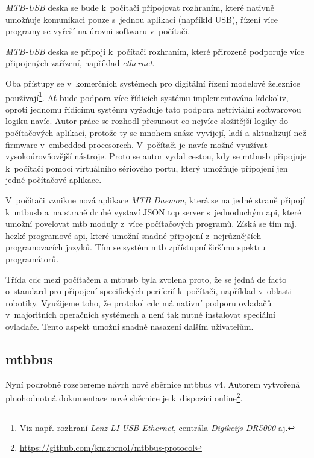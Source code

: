 \begin{compactenum}
\item \textit{MTB-USB} deska se bude k~počítači připojovat rozhraním, které
	nativně umožňuje komunikaci pouze s~jednou aplikací (napříkld USB), řízení
	více programy se vyřeší na úrovni softwaru v~počítači.
\item \textit{MTB-USB} deska se připojí k~počítači rozhraním, které přirozeně
	podporuje více připojených zařízení, například \textit{ethernet}.
\end{compactenum}

Oba přístupy se v~komerčních systémech pro digitální řízení modelové železnice
používají\footnote{Viz např. rozhraní \textit{Lenz LI-USB-Ethernet}, centrála
\textit{Digikeijs DR5000} aj.}.
Ať bude podpora více řídicích systému implementována kdekoliv, oproti jednomu
řídicímu systému vyžaduje tato podpora netriviální softwarovou logiku navíc.
Autor práce se rozhodl přesunout co nejvíce složitější logiky do počítačových
aplikací, protože ty se mnohem snáze vyvíjejí, ladí a aktualizují než
firmware v~embedded procesorech. V~počítači je navíc možné využívat
vysokoúrovňovější nástroje. Proto se autor vydal cestou, kdy se
\gls{mtbusb} připojuje k~počítači pomocí virtuálního sériového portu, který
umožňuje připojení jen jedné počítačové aplikace.

V~počítači vznikne nová aplikace \textit{MTB Daemon}, která se na jedné
straně připojí k~\gls{mtbusb} a~na straně druhé vystaví JSON \gls{tcp}
server s~jednoduchým \gls{api}, které umožní povelovat \gls{mtb} moduly z~více
počítačových programů. Získá se tím mj. hezké programové \gls{api}, které
umožní snadné připojení z~nejrůznějších programovacích jazyků.
Tím se systém \gls{mtb} zpřístupní širšímu spektru programátorů.

Třída \gls{cdc} mezi počítačem a \gls{mtbusb} byla zvolena proto, že se jedná
de facto o~standard pro připojení specifických periferií k~počítači, například
v~oblasti robotiky. Využijeme toho, že protokol \gls{cdc} má nativní
podporu ovladačů v~majoritních operačních systémech a není tak nutné instalovat
speciální ovladače. Tento aspekt umožní snadné nasazení dalším uživatelům.

\subsection{\gls{mtbbus}}

Nyní podrobně rozebereme návrh nové sběrnice \gls{mtbbus} v4. Autorem vytvořená
plnohodnotná dokumentace nové sběrnice je k~dispozici
online\footnote{\url{https://github.com/kmzbrnoI/mtbbus-protocol}}.


